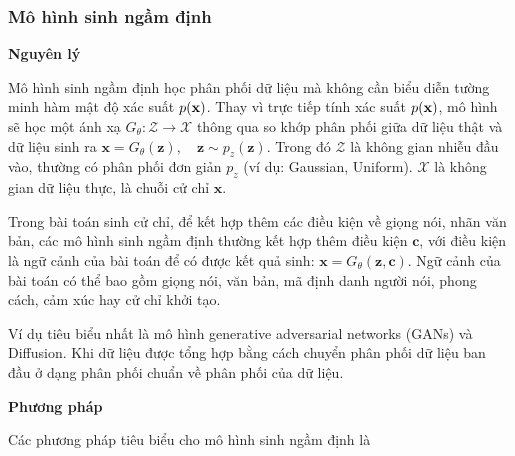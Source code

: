 \subsubsection{Mô hình sinh ngầm định}
\label{sec:ImplicitGenerativeModels}

\textbf{Nguyên lý}

Mô hình sinh ngầm định học phân phối dữ liệu mà không cần biểu diễn tường minh hàm mật độ xác suất $p(\mathbf{x})$. Thay vì trực tiếp tính xác suất $p(\mathbf{x})$, mô hình sẽ học một ánh xạ $G_{\theta}: \mathcal{Z} \to \mathcal{X}$ thông qua so khớp phân phối giữa dữ liệu thật và dữ liệu sinh ra $\mathbf{x} = G_\theta(\mathbf{z}), \quad \mathbf{z} \sim p_z(\mathbf{z})$.  Trong đó $\mathcal{Z}$ là không gian nhiễu đầu vào, thường có phân phối đơn giản \(p_{z}\) (ví dụ: Gaussian, Uniform). \(\mathcal{X}\) là không gian dữ liệu thực, là chuỗi cử chỉ \(\mathbf{x}\). 

Trong bài toán sinh cử chỉ, để kết hợp thêm các điều kiện về giọng nói, nhãn văn bản, các mô hình sinh ngầm định thường kết hợp thêm điều kiện $\mathbf{c}$, với điều kiện là ngữ cảnh của bài toán để có được kết quả sinh: $\mathbf{x} = G_\theta(\mathbf{z}, \mathbf{c})$. Ngữ cảnh của bài toán có thể bao gồm giọng nói, văn bản, mã định danh người nói, phong cách, cảm xúc hay cử chỉ khởi tạo.

%
Ví dụ tiêu biểu nhất là mô hình generative adversarial networks (GANs) và Diffusion. Khi dữ liệu được tổng hợp bằng cách chuyển phân phối dữ liệu ban đầu ở dạng phân phối chuẩn về phân phối của dữ liệu.

\textbf{Phương pháp} 

Các phương pháp tiêu biểu cho mô hình sinh ngầm định là 

